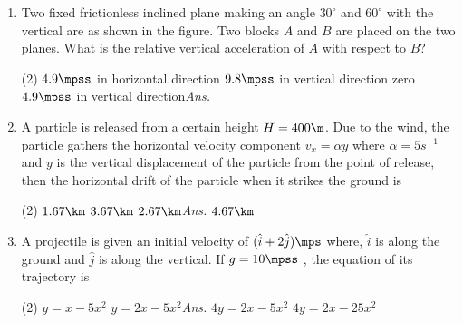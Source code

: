 \documentclass{article}
\newcommand{\ans}{\textcolor{red!95}{\textit{\quad Ans.}}}
\begin{document}
\begin{enumerate}
	\item Two fixed frictionless inclined plane making an angle $30^\circ$ and $60^\circ$ with the vertical are as shown in the figure. Two blocks $A$ and $B$ are placed on the two planes. What is the relative vertical acceleration of $A$ with respect to $B$?
	\begin{center}
	\end{center}
	\begin{tasks}(2)
		\task $4.9 \mpss$ in horizontal direction
		\task $9.8 \mpss$ in vertical direction
		\task zero
		\task $4.9\mpss$ in vertical direction\ans
	\end{tasks}
	
	\item A particle is released from a certain height $H = 400 \m$. Due to the wind, the particle gathers the
horizontal velocity component $v_x = \alpha y$ where $\alpha = 5 s^{-1}$ and $y$ is the vertical displacement of the particle from the point of release, then the horizontal drift of the particle when it strikes the ground is
	\begin{tasks}(2)
		\task $1.67\km$
		\task $3.67\km$
		\task $2.67\km$\ans
		\task $4.67\km$
	\end{tasks}
	
	\item A projectile is given an initial velocity of $(\hat{i} + 2\hat{j}) \mps$ where, $\hat{i}$ is along the ground and $\hat{j}$ is along the vertical. If $g = 10 \mpss$ , the equation of its trajectory is
	\begin{center}
	\end{center}
	\begin{tasks}(2)
		\task $y=x-5x^2$
		\task $y=2x-5x^2$\ans
		\task $4y=2x-5x^2$
		\task $4y=2x-25x^2$
	\end{tasks}
	

\end{enumerate}
\end{document}
